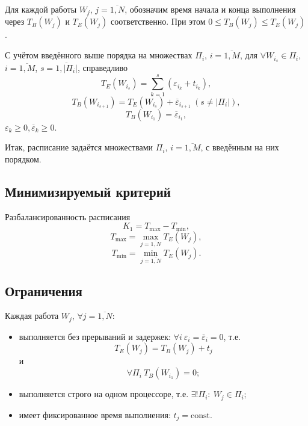 \documentclass[12pt]{article}
\begin{document}
Для каждой работы $W_j$, $j = \overline{1, N}$, обозначим время начала и конца
выполнения через $T_B(W_j)$ и $T_E(W_j)$ соответственно.
При этом $0 \leq T_B(W_j) \leq T_E(W_j)$.

С учётом введённого выше порядка на множествах $\Pi_i$, $i = \overline{1, M}$,
для $\forall W_{i_s} \in \Pi_i$,
$i = \overline{1, M}$, $s = \overline{1, |\Pi_i|}$, справедливо
\begin{equation}
    T_E(W_{i_s}) = \sum\limits_{k=1}^s (\varepsilon_{i_k} + t_{i_k}),
\end{equation}
\begin{equation}
    T_B(W_{i_{s + 1}}) = T_E(W_{i_s}) + \overline\varepsilon_{i_{s+1}}~
    (s \neq |\Pi_i|),
\end{equation}
\begin{equation}
    T_B(W_{i_1}) = \overline\varepsilon_{i_1},
\end{equation}
$\varepsilon_k \geq 0, \overline\varepsilon_k \geq 0$.

Итак, расписание задаётся множествами $\Pi_i$, $i = \overline{1, M}$,
с введённым на них порядком.

\subsection*{Минимизируемый критерий}
\label{crit}
Разбалансированность расписания
\begin{equation}
    K_1 = T_{\max} - T_{\min},
\end{equation}
\begin{equation}
    T_{\max} = \max_{j = \overline{1, N}} T_E(W_j),
\end{equation}
\begin{equation}
    T_{\min} = \min_{j = \overline{1, N}} T_E(W_j).
\end{equation}

\subsection*{Ограничения}
Каждая работа $W_j$, $\forall j = \overline{1, N}$:
\begin{itemize}
    \item выполняется без прерываний и задержек:
    $\forall i~\varepsilon_i = \overline\varepsilon_i = 0$, т.е.
    \begin{equation}
        T_E(W_j) = T_B(W_j) + t_j
    \end{equation}
    и
    \begin{equation}
        \forall \Pi_i~T_B(W_{i_1}) = 0;
    \end{equation}

    \item выполняется строго на одном процессоре, т.е.
    $\exists! \Pi_i:~W_j \in \Pi_i;$

    \item имеет фиксированное время выполнения: $t_j = \text{const}$.
\end{itemize}
\end{document}

